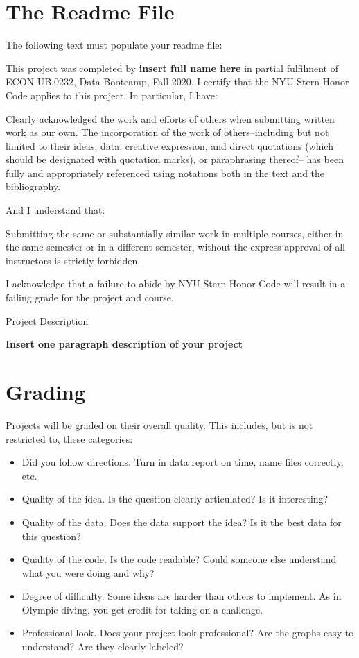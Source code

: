 \section*{The Readme File}

The following text must populate your readme file:
\bigskip
\bigskip

This project was completed by \textbf{insert full name here} in partial fulfilment of  ECON-UB.0232, Data Bootcamp, Fall 2020. I certify that the NYU Stern Honor Code applies to this project. In particular, I have:

Clearly acknowledged the work and efforts of others when submitting written work as
our own. The incorporation of the work of others--including but not limited to their ideas,
data, creative expression, and direct quotations (which should be designated with quotation
marks), or paraphrasing thereof-- has been fully and appropriately referenced using notations
both in the text and the bibliography.

And I understand that:

Submitting the same or substantially similar work in multiple courses, either in the
same semester or in a different semester, without the express approval of all instructors is
strictly forbidden.

I acknowledge that a failure to abide by NYU Stern Honor Code will result in a failing grade for the project and course.

Project Description

\textbf{Insert one paragraph description of your project}

\newpage

\section*{Grading}

Projects will be graded on their overall quality.  This includes, but is not restricted to,
these categories:
%
\begin{itemize}
\item Did you follow directions. Turn in data report on time, name files correctly, etc.
\item Quality of the idea.  Is the question clearly articulated?  Is it interesting?
\item Quality of the data.  Does the data support the idea?
Is it the best data for this question?
\item Quality of the code. Is the code readable? Could someone else understand what you were doing and why?
\item Degree of difficulty.  Some ideas are harder than others to implement.
As in Olympic diving, you get credit for taking on a challenge.
\item Professional look.  Does your project look professional?  Are the graphs
easy to understand?  Are they clearly labeled?
\end{itemize}


%



%


